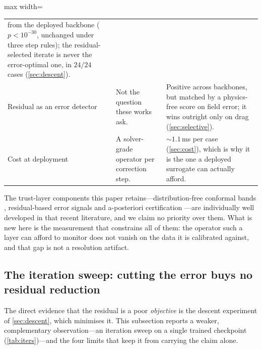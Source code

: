 \begin{table}[t]
\begin{adjustbox}{max width=\textwidth}
\begin{tabular}{p{} p{} p{}}
   from the deployed backbone ($p<10^{-30}$, unchanged under three step rules); the
   residual-selected iterate is never the error-optimal one, in $24/24$ cases
   (\autoref{sec:descent}). \\
\addlinespace
Residual as an error detector
 & Not the question these works ask.
 & Positive across backbones, but matched by a physics-free score on field error;
   it wins outright only on drag (\autoref{sec:selective}). \\
\addlinespace
Cost at deployment
 & A solver-grade operator per correction step.
 & ${\sim}1.1$\,ms per case (\autoref{sec:cost}), which is why it is the one a
   deployed surrogate can actually afford. \\
\bottomrule
\end{tabular}
\end{adjustbox}
\end{table}

The trust-layer components this paper retains---distribution-free conformal bands
\citep{gopakumar2025pre, jia2026multigranularity}, residual-based error signals
\citep{roy2025anchor, song2026structureaware} and a-posteriori certification
\citep{mukherjee2026certification}---are individually well developed in that recent
literature, and we claim no priority over them. What is new here is the measurement that
constrains all of them: the operator such a layer can afford to monitor does not vanish on
the data it is calibrated against, and that gap is not a resolution artifact.



\subsection{The iteration sweep: cutting the error buys no residual reduction}
\label{sec:iters}

The direct evidence that the residual is a poor \emph{objective} is the descent experiment
of \autoref{sec:descent}, which minimises it. This subsection reports a weaker,
complementary observation---an iteration sweep on a single trained checkpoint
(\autoref{tab:iters})---and the four limits that keep it from carrying the claim alone.

